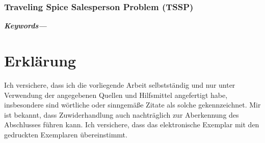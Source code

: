 \documentclass[
fontsize=12pt,
a4paper,  %
twoside,  %
bibliography=totoc,
headsepline,
cleardoublepage=empty,
parskip=half,
draft=false
]{scrbook}
\begin{document}
	\subsection{Traveling Spice Salesperson Problem (TSSP)} \label{subsec:TSSP}
	
	
	
	
	
	\small	
	\textbf{\textit{Keywords---}}
	
	
	
	
	
	
	
	\listoffigures
	\listoftables
	
	
		
		
		\appendix
		
		
		
		\chapter*{Erklärung}
		
		Ich versichere, dass ich die vorliegende Arbeit selbstständig und nur unter Verwendung der angegebenen Quellen und Hilfsmittel angefertigt habe, insbesondere sind wörtliche oder sinngemäße Zitate als solche gekennzeichnet. Mir ist bekannt, dass Zuwiderhandlung auch nachträglich zur Aberkennung des Abschlusses führen kann.
		Ich versichere, dass das elektronische Exemplar mit den gedruckten Exemplaren übereinstimmt.
		
\end{document}
